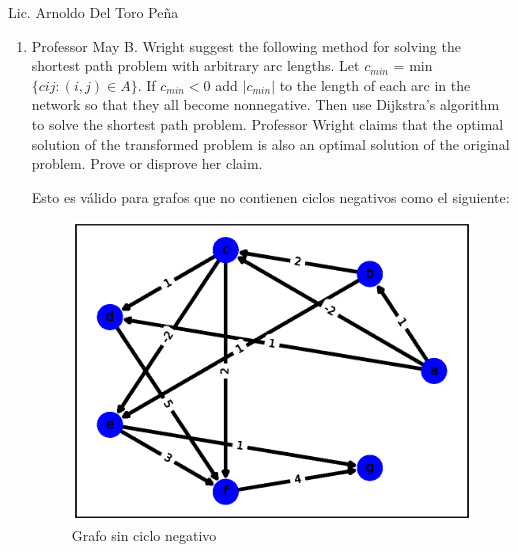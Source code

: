 \documentclass{report}
\begin{document}
\begin{center}
  { \LARGE Lic. Arnoldo Del Toro Peña}
\end{center}

\begin{enumerate}
  \item Professor May B. Wright suggest the following method for solving the shortest path problem with arbitrary arc lengths. Let $c_{min}$ = min $\{c ij : (i,j) \in A\}$. If $c_{min} <0$ add $|c_{min} |$ to the length of each arc
  in the network so that they all become nonnegative. Then use Dijkstra’s algorithm to solve the
  shortest path problem. Professor Wright claims that the optimal solution of the transformed
  problem is also an optimal solution of the original problem. Prove or disprove her claim.

  Esto es válido para grafos que no contienen ciclos negativos como el siguiente:
  \begin{figure}[h!t]
    \centering
    \includegraphics[scale = 0.4]{ejemplo6.eps}
    \caption{Grafo sin ciclo negativo}
    \label{sinciclonegativo}
  \end{figure} 


\end{enumerate}
\end{document}
